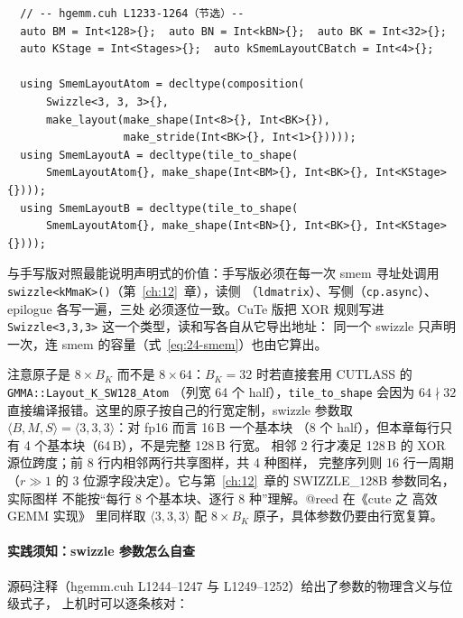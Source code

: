 \begin{lstlisting}
  // -- hgemm.cuh L1233-1264（节选）--
  auto BM = Int<128>{};  auto BN = Int<kBN>{};  auto BK = Int<32>{};
  auto KStage = Int<Stages>{};  auto kSmemLayoutCBatch = Int<4>{};

  using SmemLayoutAtom = decltype(composition(
      Swizzle<3, 3, 3>{},
      make_layout(make_shape(Int<8>{}, Int<BK>{}),
                  make_stride(Int<BK>{}, Int<1>{}))));
  using SmemLayoutA = decltype(tile_to_shape(
      SmemLayoutAtom{}, make_shape(Int<BM>{}, Int<BK>{}, Int<KStage>{})));
  using SmemLayoutB = decltype(tile_to_shape(
      SmemLayoutAtom{}, make_shape(Int<BN>{}, Int<BK>{}, Int<KStage>{})));
\end{lstlisting}

与手写版对照最能说明声明式的价值：手写版必须在每一次 smem 寻址处调用
\texttt{swizzle}\allowbreak\texttt{<kMmaK>()}（第~\ref{ch:12}~章），读侧
（\texttt{ldmatrix}）、写侧（\texttt{cp.async}）、epilogue 各写一遍，三处
必须逐位一致。CuTe 版把 XOR
规则写进 \texttt{Swizzle\allowbreak{}<3,\allowbreak{}3,\allowbreak{}3>} 这一个类型，读和写各自从它导出地址：
同一个 swizzle 只声明一次，连 smem 的容量（式~\eqref{eq:24-smem}）也由它算出。

注意原子是 $8\times B_K$ 而不是 $8\times 64$：$B_K=32$ 时若直接套用 CUTLASS 的
\texttt{GMMA::}\allowbreak\texttt{Layout\_K\_}\allowbreak\texttt{SW128\_Atom}
（列宽 64 个 half），\texttt{tile\_\allowbreak{}to\_\allowbreak{}shape}
会因为 $64\nmid32$ 直接编译报错。这里的原子按自己的行宽定制，swizzle 参数取
$\langle B,M,S\rangle=\langle3,3,3\rangle$：对 fp16 而言 16\,B 一个基本块
（8 个 half），但本章每行只有 4 个基本块（64\,B），不是完整 128\,B 行宽。
相邻 2 行才凑足 128\,B 的 XOR 源位跨度；前 8 行内相邻两行共享图样，共 4 种图样，
完整序列则 16 行一周期（$r\gg1$ 的 3 位源字段决定）。它与第~\ref{ch:12}~章的 SWIZZLE\_128B 参数同名，实际图样
不能按“每行 8 个基本块、逐行 8 种”理解。@reed 在《cute 之 高效 GEMM 实现》
里同样取 $\langle3,3,3\rangle$ 配 $8\times B_K$ 原子，具体参数仍要由行宽复算。

\paragraph{实践须知：swizzle 参数怎么自查}

源码注释（hgemm.cuh L1244--1247 与 L1249--1252）给出了参数的物理含义与位级式子，
上机时可以逐条核对：

